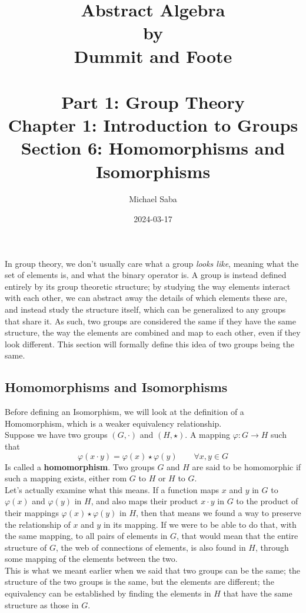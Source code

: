 \documentclass[12pt]{article}
\title{%
    \Huge Abstract Algebra \\
    \large by \\
    \Large Dummit and Foote \\~\\
    \huge Part 1: Group Theory \\
    \LARGE Chapter 1: Introduction to Groups \\
    \Large Section 6: Homomorphisms and Isomorphisms
}
\date{2024-03-17}
\author{Michael Saba}
\begin{document}
    \maketitle
    \newpage


    In group theory, we don't usually care what a group
    \textit{looks like}, meaning what the set of elements is,
    and what the binary operator is.
    A group is instead defined entirely by its group theoretic structure;
    by studying the way elements interact with each other,
    we can abstract away the details of which elements these are,
    and instead study the structure itself,
    which can be generalized to any groups that share it.
    As such, two groups are considered the same if they have the
    same structure,
    the way the elements are combined and map to each other,
    even if they look different.
    This section will formally define this idea of two groups being
    the same. \\

    \subsection*{Homomorphisms and Isomorphisms}

    Before defining an Isomorphism,
    we will look at the definition of a Homomorphism,
    which is a weaker equivalency relationship. \\
    Suppose we have two groups $(G, \cdot)$ and $(H, \star)$.
    A mapping $\varphi: G \rightarrow H$ such that
    \[ \varphi(x \cdot y) = \varphi(x) \star \varphi(y) 
    \qquad \forall x, y \in G \]
    Is called a \textbf{homomorphism}.
    Two groups $G$ and $H$ are said to be homomorphic
    if such a mapping exists, either rom $G$ to $H$ or $H$ to $G$. \\

    Let's actually examine what this means.
    If a function maps $x$ and $y$ in $G$
    to $\varphi(x)$ and $\varphi(y)$ in $H$,
    and also maps their product $x \cdot y$ in $G$
    to the product of their mappings $\varphi(x) \star \varphi(y)$ in $H$,
    then that means we found a way
    to preserve the relationship of $x$ and $y$
    in its mapping.
    If we were to be able to do that, with the same mapping,
    to all pairs of elements in $G$,
    that would mean that the entire structure of $G$,
    the web of connections of elements,
    is also found in $H$,
    through some mapping of the elements between the two. \\
    This is what we meant earlier when we said that two groups
    can be the same;
    the structure of the two groups is the same,
    but the elements are different;
    the equivalency can be established by finding
    the elements in $H$ that have the same structure as those in $G$. \\
\end{document}
